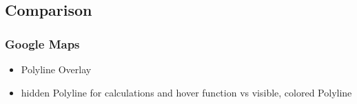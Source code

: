 \subsection{Comparison}
\subsubsection{Google Maps}
\begin{itemize}
	\item Polyline Overlay
	\item hidden Polyline for calculations and hover function vs visible, colored Polyline	
\end{itemize}
\clearpage